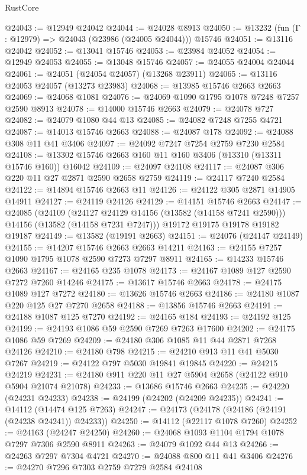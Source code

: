 \begin{lexlean}{RustCore}
\begin{coremodule}
@24043 := @12949 @24042
@24044 := @24028 @8913
@24050 := @13232 (fun (Γ : @12979) => @24043 (@23986 (@24005 @24044))) @15746
@24051 := @13116 @24042
@24052 := @13041 @15746
@24053 := @23984 @24052
@24054 := @12949 @24053
@24055 := @13048 @15746
@24057 := @24055 @24004 @24044
@24061 := @24051 (@24054 @24057) (@13268 @23911)
@24065 := @13116 @24053 @24057 (@13273 @23983)
@24068 := @13985 @15746 @2663 @2663
@24069 := @24068 @1081
@24076 := @24069 @1090 @1795 @1078 @7248 @7257 @2590 @8913
@24078 := @14000 @15746 @2663
@24079 := @24078 @727
@24082 := @24079 @1080 @44 @13
@24085 := @24082 @7248 @7255 @4721
@24087 := @14013 @15746 @2663
@24088 := @24087 @178
@24092 := @24088 @308 @11 @41 @3406
@24097 := @24092 @7247 @7254 @2759 @7230 @2584
@24108 := @13302 @15746 @2663 @160 @11 @160 @3406 (@13310 (@13311 @15746 @160)) @16042
@24109 := @24097 @24108
@24117 := @24087 @306 @220 @11 @27 @2871 @2590 @2658 @2759
@24119 := @24117 @7240 @2584
@24122 := @14894 @15746 @2663 @11
@24126 := @24122 @305 @2871 @14905 @14911
@24127 := @24119 @24126
@24129 := @14151 @15746 @2663
@24147 := @24085
    (@24109
      (@24127 @24129 @14156 (@13582 (@14158 @7241 @2590)))
      @14156
      (@13582 (@14158 @7231 @7247)))
    @19172
    @19175
    @19178
    @19182
    @19187
@24149 := @13582 (@19191 @2663)
@24151 := @24076 (@24147 @24149)
@24155 := @14207 @15746 @2663 @2663 @14211
@24163 := @24155 @7257 @1090 @1795 @1078 @2590 @7273 @7297 @8911
@24165 := @14233 @15746 @2663
@24167 := @24165 @235 @1078
@24173 := @24167 @1089 @127 @2590 @7272 @7260 @14246
@24175 := @13617 @15746 @2663
@24178 := @24175 @1089 @127 @7272
@24180 := @13626 @15746 @2663
@24186 := @24180 @1087 @220 @125 @27 @7270 @2658
@24188 := @13856 @15746 @2663
@24191 := @24188 @1087 @125 @7270
@24192 := @24165 @184
@24193 := @24192 @125
@24199 := @24193 @1086 @59 @2590 @7269 @7263 @17600
@24202 := @24175 @1086 @59 @7269
@24209 := @24180 @306 @1085 @11 @44 @2871 @7268 @24126
@24210 := @24180 @798
@24215 := @24210 @913 @11 @41 @5030 @7267
@24219 := @24122 @797 @5030 @19841 @19845
@24220 := @24215 @24219
@24231 := @24180 @911 @220 @11 @27 @5904 @2658 (@24122 @910 @5904 @21074 @21078)
@24233 := @13686 @15746 @2663
@24235 := @24220 (@24231 @24233)
@24238 := @24199 (@24202 (@24209 @24235))
@24241 := @14112 (@14474 @125 @7263)
@24247 := @24173 (@24178 (@24186 (@24191 (@24238 @24241)) @24233))
@24250 := @14112 (@22117 @1078 @7260)
@24252 := @24163 (@24247 @24250)
@24260 := @24068 @1093 @1104 @1794 @1078 @7297 @7306 @2590 @8911
@24263 := @24079 @1092 @44 @13
@24266 := @24263 @7297 @7304 @4721
@24270 := @24088 @800 @11 @41 @3406
@24276 := @24270 @7296 @7303 @2759 @7279 @2584 @24108

\end{coremodule}
\end{lexlean}
